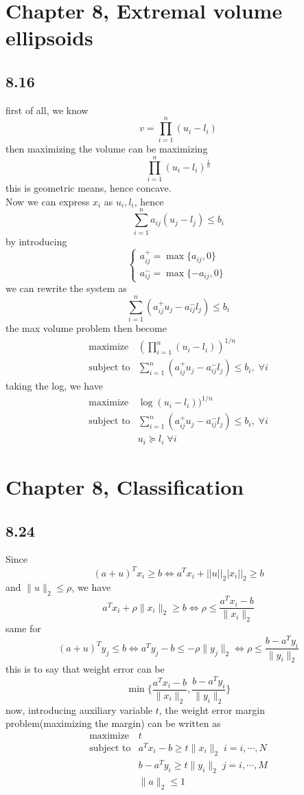\documentclass{article}
\begin{document}
\section*{Chapter 8, Extremal volume ellipsoids}	
\subsection*{8.16}
first of all, we know
\[v = \prod_{i=1}^{n}(u_i-l_i)\]
then maximizing the volume can be maximizing 
\[\prod_{i=1}^{n}(u_i-l_i)^{\frac{1}{n}}\]
this is geometric means, hence concave. \\
Now we can express $x_i$ as $u_i, l_i$, hence
\[\sum_{i=1}^{n}a_{ij}(u_j-l_j) \le b_i\]
by introducing 
\[\begin{cases}
a_{ij}^+  = \max \{a_{ij}, 0\}\\
a_{ij}^- = \max \{-a_{ij}, 0\}\
\end{cases}
\]
we can rewrite the system as 
\[\sum_{i=1}^{n}(a_{ij}^+u_j-a_{ij}^-l_j) \le b_i\]
the max volume problem then become
\[\begin{array}{ll}
    \mbox{maximize}   &(\prod_{i=1}^{n}(u_i-l_i))^{1/n} \\
    \mbox{subject to} & \sum_{i=1}^{n}(a_{ij}^+u_j-a_{ij}^-l_j) \le b_i, \; \forall i
      \end{array} 
\]
 taking the log, we have 
      \[  \boxed{  \begin{array}{ll}
    \mbox{maximize}   &\log(u_i-l_i))^{1/n} \\
    \mbox{subject to} & \sum_{i=1}^{n}(a_{ij}^+u_j-a_{ij}^-l_j) \le b_i, \; \forall i \\
    & u_i \succeq l_i  \; \forall i
        \end{array} 
   }
  \]   
  
\section*{Chapter 8, Classification}	
\subsection*{8.24}
Since \[(a+u)^Tx_i \ge b \Leftrightarrow a^Tx_i+||u||_2|x_i||_2 \ge b\]
and $\|u\|_2 \le \rho$, we have
\[a^Tx_i+\rho\|x_i\|_2 \ge b \Leftrightarrow  \rho \le \dfrac{a^Tx_i - b}{\|x_i\|_2}\]
same for 
\[(a+u)^Ty_j \le b \Leftrightarrow a^Ty_j-b \le -\rho \|y_j\|_2 \Leftrightarrow  \rho \le \dfrac{  b -a^Ty_i}{\|y_i\|_2} \]
this is to say that weight error can be 
\[\min \{ \dfrac{a^Tx_i - b}{\|x_i\|_2} ,  \dfrac{  b -a^Ty_i}{\|y_i\|_2} \}\]
now, introducing auxiliary variable $t$, the weight error margin problem(maximizing the margin) can be written as 
  \[  \boxed{  \begin{array}{ll}
    \mbox{maximize}   &t \\
    \mbox{subject to} & a^Tx_i - b \ge t \|x_i\|_2\;  i = i, \cdots, N \\
     & b -a^Ty_i \ge t \|y_i\|_2\;  j = i, \cdots, M \\
     & \| a\|_2 \le 1
        \end{array} 
   }
  \]   
  
\end{document}
